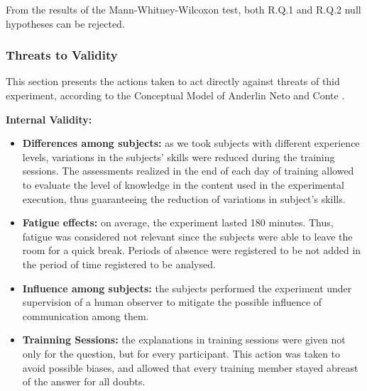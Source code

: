 From the results of the Mann-Whitney-Wilcoxon test, both R.Q.1 and R.Q.2 null hypotheses can be rejected.



\subsubsection{Threats to Validity}\label{sec:threats}

This section presents the actions taken to act directly against threats of thid experiment, according to the Conceptual Model of Anderlin Neto and Conte \cite{neto13}.

\textbf{Internal Validity:} %

\begin{itemize}
\item \textbf{Differences among subjects:} as we took subjects with different experience levels, variations in the subjects' skills were reduced during the training sessions. The assessments realized in the end of each day of training allowed to evaluate the level of knowledge in the content used in the experimental execution, thus guaranteeing the reduction of variations in subject's skills.

\item \textbf{Fatigue effects:} on average, the experiment lasted 180 minutes. Thus, fatigue was considered not relevant since the subjects were able to leave the room for a quick break. Periods of absence were registered to be not added in the period of time registered to be analysed.

\item \textbf{Influence among subjects:} the subjects performed the experiment under supervision of a human observer to mitigate the possible influence of communication among them.

\item \textbf{Trainning Sessions:} the explanations in training sessions were given not only for the question, but for every participant. This action was taken to avoid possible biases, and allowed that every training member stayed abreast of the answer for all doubts.
\end{itemize}



